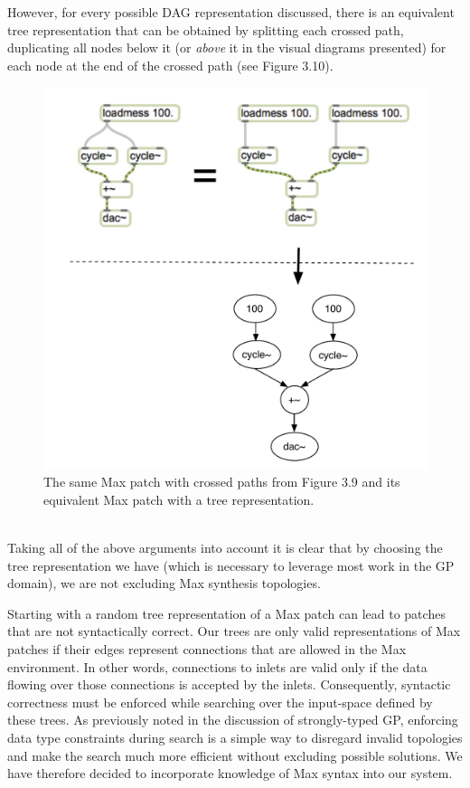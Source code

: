 \documentclass[a4paper,12pt]{report} 	%
\numberwithin{figure}{chapter}
\numberwithin{table}{chapter}
\numberwithin{equation}{chapter}
\begin{document}
\begin{flushleft}
However, for every possible DAG representation discussed, there is an equivalent tree representation that can be obtained by splitting each crossed path, duplicating all nodes below it (or \emph{above} it in the visual diagrams presented) for each node at the end of the crossed path (see Figure 3.10).
\begin{figure}[h!]
\begin{center}
\includegraphics[scale=0.8]{MaxDAGsCrossedPaths2}
\caption[Uncrossing Paths to Form a Tree]{The same Max patch with crossed paths from Figure 3.9 and its equivalent Max patch with a tree representation.}
\end{center}
\end{figure}
\\
Taking all of the above arguments into account it is clear that by choosing the tree representation we have (which is necessary to leverage most work in the GP domain), we are not excluding Max synthesis topologies. 

Starting with a random tree representation of a Max patch can lead to patches that are not syntactically correct. Our trees are only valid representations of Max patches if their edges represent connections that are allowed in the Max environment. In other words, connections to inlets are valid only if the data flowing over those connections is accepted by the inlets. Consequently, syntactic correctness must be enforced while searching over the input-space defined by these trees. As previously noted in the discussion of strongly-typed GP, enforcing data type constraints during search is a simple way to disregard invalid topologies and make the search much more efficient without excluding possible solutions. We have therefore decided to incorporate knowledge of Max syntax into our system.


\end{flushleft}
\end{document}
